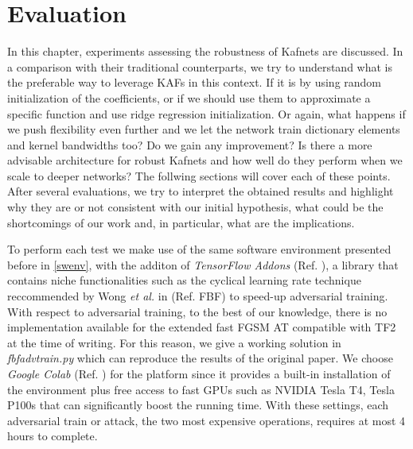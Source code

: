 \documentclass[LaM,binding=0.6cm]{./packages/sapthesis/sapthesis}
\begin{document}
       

        


\chapter{Evaluation}

In this chapter, experiments assessing the robustness of Kafnets are discussed. In a comparison with their traditional counterparts, we try to understand 
what is the preferable way to leverage KAFs in this context. If it is by using random initialization of the coefficients, or if we should use them 
to approximate a specific function and use ridge regression initialization. Or again, what happens if we push flexibility even further and we let 
the network train dictionary elements and kernel bandwidths too? Do we gain any improvement? Is there a more advisable architecture for robust 
Kafnets and how well do they perform when we scale to deeper networks? The follwing sections will cover each of these points. After several evaluations,
we try to interpret the obtained results and highlight why they are or not consistent with our initial hypothesis, what could be the shortcomings of our 
work and, in particular, what are the implications. \par
To perform each test we make use of the same software environment presented before in \ref{swenv}, with the additon of \textit{TensorFlow Addons} (Ref. ),
a library that contains niche functionalities such as the cyclical learning rate technique reccommended by Wong \textit{et al.} in (Ref. FBF) to speed-up adversarial training. 
With respect to adversarial training, to the best of our knowledge, there is no implementation available for the extended fast FGSM AT compatible with TF2
at the time of writing. For this reason, we give a working solution in \textit{fbfadvtrain.py} which can reproduce the results
of the original paper. We choose \textit{Google Colab} (Ref. ) for the platform since it provides a built-in installation of the environment plus free access 
to fast GPUs such as NVIDIA Tesla T4, Tesla P100s that can significantly boost the running time. With these settings, each adversarial train 
or attack, the two most expensive operations, 
requires at most 4 hours to complete.
\end{document}
